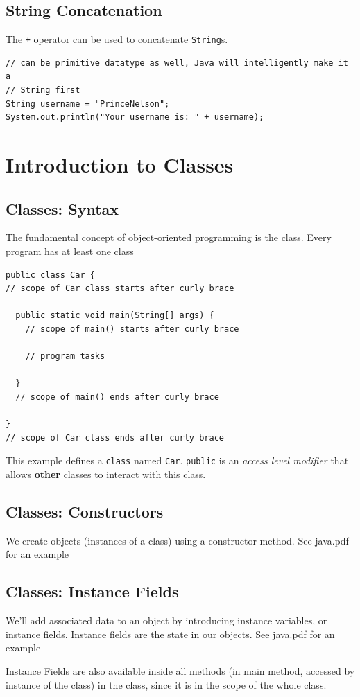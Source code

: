 \documentclass[a4paper, 12pt]{article}
\begin{document}
\subsection{String Concatenation}
The \verb|+| operator can be used to concatenate \verb|String|s.
\begin{verbatim}
// can be primitive datatype as well, Java will intelligently make it a 
// String first
String username = "PrinceNelson";
System.out.println("Your username is: " + username);
\end{verbatim}


\section{Introduction to Classes}
\subsection{Classes: Syntax}
The fundamental concept of object-oriented programming is the class. Every program has at least one class
\begin{verbatim}
public class Car {
// scope of Car class starts after curly brace

  public static void main(String[] args) {
    // scope of main() starts after curly brace

    // program tasks

  }
  // scope of main() ends after curly brace

}
// scope of Car class ends after curly brace
\end{verbatim}
This example defines a \verb|class| named \verb|Car|. \verb|public| is an \textit{access level modifier} that allows \textbf{other} classes to interact with this class.

\subsection{Classes: Constructors}
We create objects (instances of a class) using a constructor method. See java.pdf for an example

\subsection{Classes: Instance Fields}
We'll add associated data to an object by introducing instance variables, or instance fields. Instance fields are the state in our objects. See java.pdf for an example

Instance Fields are also available inside all methods {\color{red}(in main method, accessed by instance of the class)} in the class, since it is in the scope of the whole class.
\end{document}
